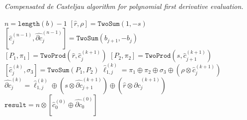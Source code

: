 \begin{breakablealgorithm}
  \caption{\textit{Compensated de Casteljau
      algorithm for polynomial first derivative evaluation.}}
  \label{alg:comp-de-casteljau-derivative}

  \begin{algorithmic}
      \State \(n = \texttt{length}(b) - 1\)
      \State \(\left[\widehat{r}, \rho\right] = \mathtt{TwoSum}(1, -s)\)
      \\
        \State \(\left[\widehat{c}_j^{(n - 1)},
          \widehat{\partial c}_j^{(n - 1)}\right] =
          \mathtt{TwoSum}(b_{j + 1}, -b_j)\)
      \EndFor
      \\
          \State \(\left[P_1, \pi_1\right] = \mathtt{TwoProd}\left(
              \widehat{r}, \widehat{c}_j^{(k + 1)}\right)\)
          \State \(\left[P_2, \pi_2\right] = \mathtt{TwoProd}\left(
              s, \widehat{c}_{j + 1}^{(k + 1)}\right)\)
          \State \(\left[\widehat{c}_j^{(k)}, \sigma_3\right] =
              \mathtt{TwoSum}(P_1, P_2)\)
          \State \(\widehat{\ell}_{1, j}^{(k)} = \pi_1 \oplus \pi_2 \oplus
              \sigma_3 \oplus \left(\rho \otimes
              \widehat{c}_j^{(k + 1)}\right)\)
          \State \(\widehat{\partial c}_j^{(k)} =
              \widehat{\ell}_{1, j}^{(k)} \oplus
              \left(s \otimes \widehat{\partial c}_{j + 1}^{(k + 1)}
              \right) \oplus
              \left(\widehat{r} \otimes
              \widehat{\partial c}_j^{(k + 1)}\right)\)
        \EndFor
      \EndFor
      \\
      \State \(\mathtt{result} = n \otimes \left[\widehat{c}_0^{(0)} \oplus
          \widehat{\partial c}_0^{(0)}\right]\)
    \EndFunction
  \end{algorithmic}
\end{breakablealgorithm}
